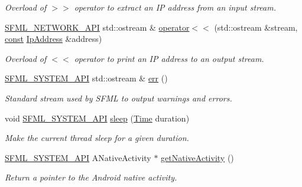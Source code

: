 \begin{DoxyCompactItemize}
\begin{DoxyCompactList}\small\item\em Overload of $>$$>$ operator to extract an I\-P address from an input stream. \end{DoxyCompactList}\item 
\hyperlink{sfml_2dep_2_s_f_m_l-2_84_82_2include_2_s_f_m_l_2_network_2_export_8hpp_ac5d46d4ffd98e947e28c54d051b338e7}{S\-F\-M\-L\-\_\-\-N\-E\-T\-W\-O\-R\-K\-\_\-\-A\-P\-I} std\-::ostream \& \hyperlink{namespacesf_ae2ba858510164a0143cd44efc843dcbe}{operator$<$$<$} (std\-::ostream \&stream, \hyperlink{term__entry_8h_a57bd63ce7f9a353488880e3de6692d5a}{const} \hyperlink{classsf_1_1_ip_address}{Ip\-Address} \&address)
\begin{DoxyCompactList}\small\item\em Overload of $<$$<$ operator to print an I\-P address to an output stream. \end{DoxyCompactList}\item 
\hyperlink{sfml_2dep_2_s_f_m_l-2_84_82_2include_2_s_f_m_l_2_system_2_export_8hpp_a6476c9e422606477a4c23d92b1d79a1f}{S\-F\-M\-L\-\_\-\-S\-Y\-S\-T\-E\-M\-\_\-\-A\-P\-I} std\-::ostream \& \hyperlink{group__system_ga7fe7f475639e26334606b5142c29551f}{err} ()
\begin{DoxyCompactList}\small\item\em Standard stream used by S\-F\-M\-L to output warnings and errors. \end{DoxyCompactList}\item 
void \hyperlink{sfml_2dep_2_s_f_m_l-2_84_82_2include_2_s_f_m_l_2_system_2_export_8hpp_a6476c9e422606477a4c23d92b1d79a1f}{S\-F\-M\-L\-\_\-\-S\-Y\-S\-T\-E\-M\-\_\-\-A\-P\-I} \hyperlink{group__system_ga2f2620831533dee0ed432ed982342e09}{sleep} (\hyperlink{classsf_1_1_time}{Time} duration)
\begin{DoxyCompactList}\small\item\em Make the current thread sleep for a given duration. \end{DoxyCompactList}\item 
\hyperlink{sfml_2dep_2_s_f_m_l-2_84_82_2include_2_s_f_m_l_2_system_2_export_8hpp_a6476c9e422606477a4c23d92b1d79a1f}{S\-F\-M\-L\-\_\-\-S\-Y\-S\-T\-E\-M\-\_\-\-A\-P\-I} A\-Native\-Activity $\ast$ \hyperlink{group__system_ga9f5460043bdbd5be0ccccd2e6f0ddc41}{get\-Native\-Activity} ()
\begin{DoxyCompactList}\small\item\em Return a pointer to the Android native activity. \end{DoxyCompactList}\end{DoxyCompactItemize}
